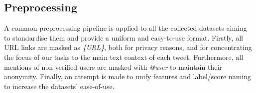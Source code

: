 


\subsection{Preprocessing} 
A common preprocessing pipeline is applied to all the collected datasets aiming to standardise them and provide a uniform and easy-to-use format. Firstly, all URL links are masked as \textit{\{URL\}}, both for privacy reasons, and for concentrating the focus of our tasks to the main text context of each tweet. Furthermore, all mentions of non-verified users are masked with \textit{@user} to maintain their anonymity. Finally, an attempt is made to unify features  and label/score naming to increase the datasets' ease-of-use.


